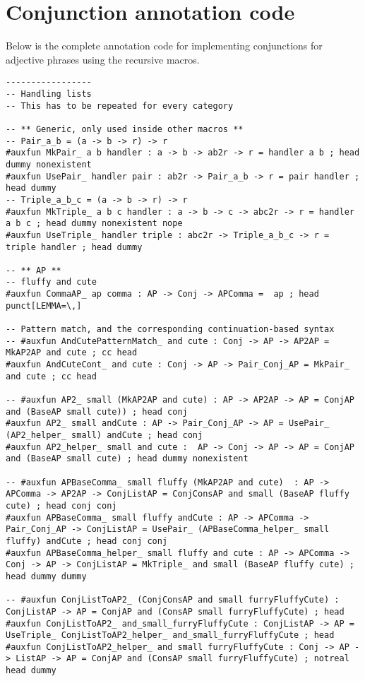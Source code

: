 \chapter{Conjunction annotation code}\label{appendix:conjunctions}

Below is the complete annotation code for implementing conjunctions for adjective phrases using the recursive macros.

\begin{lstlisting}
-----------------
-- Handling lists
-- This has to be repeated for every category

-- ** Generic, only used inside other macros **
-- Pair_a_b = (a -> b -> r) -> r
#auxfun MkPair_ a b handler : a -> b -> ab2r -> r = handler a b ; head dummy nonexistent
#auxfun UsePair_ handler pair : ab2r -> Pair_a_b -> r = pair handler ; head dummy
-- Triple_a_b_c = (a -> b -> r) -> r
#auxfun MkTriple_ a b c handler : a -> b -> c -> abc2r -> r = handler a b c ; head dummy nonexistent nope
#auxfun UseTriple_ handler triple : abc2r -> Triple_a_b_c -> r = triple handler ; head dummy

-- ** AP **
-- fluffy and cute
#auxfun CommaAP_ ap comma : AP -> Conj -> APComma =  ap ; head punct[LEMMA=\,]

-- Pattern match, and the corresponding continuation-based syntax
-- #auxfun AndCutePatternMatch_ and cute : Conj -> AP -> AP2AP = MkAP2AP and cute ; cc head
#auxfun AndCuteCont_ and cute : Conj -> AP -> Pair_Conj_AP = MkPair_ and cute ; cc head

-- #auxfun AP2_ small (MkAP2AP and cute) : AP -> AP2AP -> AP = ConjAP and (BaseAP small cute)) ; head conj
#auxfun AP2_ small andCute : AP -> Pair_Conj_AP -> AP = UsePair_ (AP2_helper_ small) andCute ; head conj
#auxfun AP2_helper_ small and cute :  AP -> Conj -> AP -> AP = ConjAP and (BaseAP small cute) ; head dummy nonexistent

-- #auxfun APBaseComma_ small fluffy (MkAP2AP and cute)  : AP -> APComma -> AP2AP -> ConjListAP = ConjConsAP and small (BaseAP fluffy cute) ; head conj conj
#auxfun APBaseComma_ small fluffy andCute : AP -> APComma -> Pair_Conj_AP -> ConjListAP = UsePair_ (APBaseComma_helper_ small fluffy) andCute ; head conj conj
#auxfun APBaseComma_helper_ small fluffy and cute : AP -> APComma -> Conj -> AP -> ConjListAP = MkTriple_ and small (BaseAP fluffy cute) ; head dummy dummy

-- #auxfun ConjListToAP2_ (ConjConsAP and small furryFluffyCute) : ConjListAP -> AP = ConjAP and (ConsAP small furryFluffyCute) ; head
#auxfun ConjListToAP2_ and_small_furryFluffyCute : ConjListAP -> AP = UseTriple_ ConjListToAP2_helper_ and_small_furryFluffyCute ; head
#auxfun ConjListToAP2_helper_ and small furryFluffyCute : Conj -> AP -> ListAP -> AP = ConjAP and (ConsAP small furryFluffyCute) ; notreal head dummy


\end{lstlisting}
